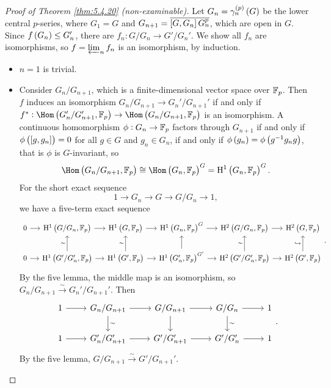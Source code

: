 \begin{proof}[Proof of Theorem \ref{thm:5.4.20} (non-examinable)]
Let $ G_n = \gamma_n^{\br{p}}\br{G} $ be the lower central $ p $-series, where $ G_1 = G $ and $ G_{n + 1} = \overline{\sbr{G, G_n}G_n^p} $, which are open in $ G $. Since $ f\br{G_n} \le G_n' $, there are $ f_n : G / G_n \to G' / G_n' $. We show all $ f_n $ are isomorphisms, so $ f = \varprojlim_n f_n $ is an isomorphism, by induction.
\begin{itemize}
\item $ n = 1 $ is trivial.
\item Consider $ G_n / G_{n + 1} $, which is a finite-dimensional vector space over $ \mathbb{F}_p $. Then $ f $ induces an isomorphism $ G_n / G_{n + 1} \to G_n' / G_{n + 1}' $ if and only if $ f^* : \Hom\br{G_n' / G_{n + 1}', \FF_p} \to \Hom\br{G_n / G_{n + 1}, \FF_p} $ is an isomorphism. A continuous homomorphism $ \phi : G_n \to \mathbb{F}_p $ factors through $ G_{n + 1} $ if and only if $ \phi\br{\sbr{g, g_n}} = 0 $ for all $ g \in G $ and $ g_n \in G_n $, if and only if $ \phi\br{g_n} = \phi\br{g^{-1}g_ng} $, that is $ \phi $ is $ G $-invariant, so
$$ \Hom\br{G_n / G_{n + 1}, \FF_p} \cong \Hom\br{G_n, \FF_p}^G = \H^1\br{G_n, \FF_p}^G. $$
For the short exact sequence
$$ 1 \to G_n \to G \to G / G_n \to 1, $$
we have a five-term exact sequence
$$
\begin{tikzcd}[column sep=small]
0 \arrow{r} & \H^1\br{G / G_n, \FF_p} \arrow{r} & \H^1\br{G, \FF_p} \arrow{r} & \H^1\br{G_n, \FF_p}^G \arrow{r} & \H^2\br{G / G_n, \FF_p} \arrow{r} & \H^2\br{G, \FF_p} \\
0 \arrow{r} & \H^1\br{G' / G_n', \FF_p} \arrow{u}{\sim} \arrow{r} & \H^1\br{G', \FF_p} \arrow{u}{\sim} \arrow{r} & \H^1\br{G_n', \FF_p}^{G'} \arrow{u} \arrow{r} & \H^2\br{G' / G_n', \FF_p} \arrow{u}{\sim} \arrow{r} & \H^2\br{G', \FF_p} \arrow{u}{\hookrightarrow}
\end{tikzcd}.
$$
By the five lemma, the middle map is an isomorphism, so $ G_n / G_{n + 1} \xrightarrow{\sim} G_n' / G_{n + 1}' $. Then
$$
\begin{tikzcd}
1 \arrow{r} & G_n / G_{n + 1} \arrow{r} \arrow{d}{\sim} & G / G_{n + 1} \arrow{r} \arrow{d} & G / G_n \arrow{r} \arrow{d}{\sim} & 1 \\
1 \arrow{r} & G_n' / G_{n + 1}' \arrow{r} & G' / G_{n + 1}' \arrow{r} & G' / G_n' \arrow{r} & 1
\end{tikzcd}.
$$
By the five lemma, $ G / G_{n + 1} \xrightarrow{\sim} G' / G_{n + 1}' $.
\end{itemize}
\end{proof}

